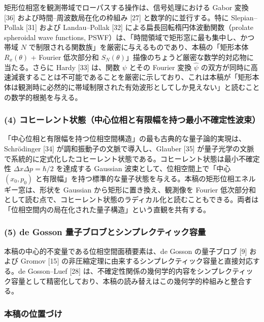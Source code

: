 \documentclass[
]{ltjsarticle}
\begin{document}
矩形位相窓を観測帯域でローパスする操作は、信号処理における Gabor 変換
{[}36{]} および時間--周波数局在化の枠組み {[}27{]}
と数学的に並行する。特に Slepian--Pollak {[}31{]} および Landau--Pollak
{[}32{]} による扁長回転楕円体波動関数（prolate spheroidal wave
functions, PSWF）は、「時間領域で矩形窓に最も集中し、かつ帯域 \(N\)
で制限される関数族」を厳密に与えるものであり、本稿の「矩形本体
\(R_x(\theta)\) + Fourier 低次部分和
\(S_N(\theta)\)」描像のちょうど厳密な数学的対応物に当たる。さらに Hardy
{[}33{]} は、関数 \(\psi\) とその Fourier 変換 \(\widehat{\psi}\)
の双方が同時に高速減衰することは不可能であることを厳密に示しており、これは本稿が「矩形本体は観測時に必然的に帯域制限された有効波形としてしか見えない」と読むことの数学的根拠を与える。

\subsubsection{(4)
コヒーレント状態（中心位相と有限幅を持つ最小不確定性波束）}\label{ux30b3ux30d2ux30fcux30ecux30f3ux30c8ux72b6ux614bux4e2dux5fc3ux4f4dux76f8ux3068ux6709ux9650ux5e45ux3092ux6301ux3064ux6700ux5c0fux4e0dux78baux5b9aux6027ux6ce2ux675f}

「中心位相と有限幅を持つ位相空間構造」の最も古典的な量子論的実現は、Schrödinger
{[}34{]} が調和振動子の文脈で導入し、Glauber {[}35{]}
が量子光学の文脈で系統的に定式化したコヒーレント状態である。コヒーレント状態は最小不確定性
\(\Delta x \Delta p = \hbar/2\) を達成する Gaussian
波束として、位相空間上で「中心 \((x_0, p_0)\)
と有限幅」を持つ標準的な量子状態を与える。本稿の矩形位相エネルギー窓は、形状を
Gaussian から矩形に置き換え、観測像を Fourier
低次部分和として読む点で、コヒーレント状態のラディカル化と読むこともできる。両者は「位相空間内の局在化された量子構造」という直観を共有する。

\subsubsection{(5) de Gosson
量子ブロブとシンプレクティック容量}\label{de-gosson-ux91cfux5b50ux30d6ux30edux30d6ux3068ux30b7ux30f3ux30d7ux30ecux30afux30c6ux30a3ux30c3ux30afux5bb9ux91cf}

本稿の中心的不変量である位相空間面積要素は、de Gosson の量子ブロブ
{[}9{]} および Gromov {[}15{]}
の非圧縮定理に由来するシンプレクティック容量と直接対応する。de
Gosson--Luef {[}28{]}
は、不確定性関係の幾何学的内容をシンプレクティック容量として精密化しており、本稿の読み替えはこの幾何学的枠組みと整合する。

\subsubsection{本稿の位置づけ}\label{ux672cux7a3fux306eux4f4dux7f6eux3065ux3051}
\end{document}
